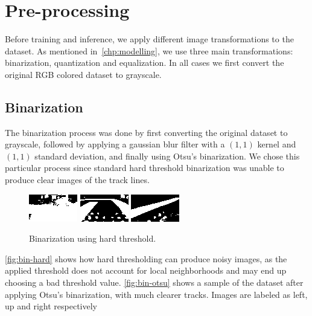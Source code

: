 
\chapter{Pre-processing}\label{chp:preprocessing}

Before training and inference, we apply different image transformations to the dataset. As
mentioned in~\autoref{chp:modelling}, we use three main transformations: binarization, quantization
and equalization. In all cases we first convert the original RGB colored dataset to grayscale.

\section{Binarization}

The binarization process was done by first converting the original dataset to grayscale, followed
by applying a gaussian blur filter with a $(1, 1)$ kernel and $(1, 1)$ standard deviation, and
finally using Otsu's binarization. We chose this particular process since standard hard threshold
binarization was unable to produce clear images of the track lines.

\begin{figure}[h]
  \centering
  \includegraphics[scale=1.75]{imgs/binary_left_h.png}
  \includegraphics[scale=1.75]{imgs/binary_up_h.png}
  \includegraphics[scale=1.75]{imgs/binary_right_h.png}
  \caption{Binarization using hard threshold.\label{fig:bin-hard}}
\end{figure}

\autoref{fig:bin-hard} shows how hard thresholding can produce noisy images, as the applied
threshold does not account for local neighborhoods and may end up choosing a bad threshold value.
\autoref{fig:bin-otsu} shows a sample of the dataset after applying Otsu's binarization, with much
clearer tracks. Images are labeled as left, up and right respectively

